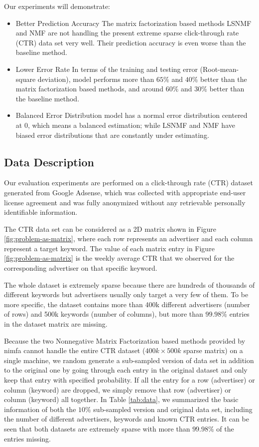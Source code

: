 Our experiments will demonstrate:
\begin{itemize} \itemsep -2pt
\item {Better Prediction Accuracy} The matrix factorization based methods LSNMF and NMF are not
  handling the present extreme sparse click-through rate (CTR) data set very well. Their
  prediction accuracy is even worse than the baseline method.
\item {Lower Error Rate} In terms of the training and testing error (Root-mean-square
  deviation), {\sppan} model performs more than $65\%$ and $40\%$ better
  than the matrix factorization based methods, and around $60\%$ and
  $30\%$ better than the baseline method.
\item {Balanced Error Distribution} {\sppan} model has a normal error distribution centered at 0,
  which means a balanced estimation; while LSNMF and NMF have biased
  error distributions that are constantly under estimating.
\end{itemize}

\subsection{Data Description}
\label{sec:data_desc}
Our evaluation experiments are performed on a click-through rate (CTR)
dataset generated from Google Adsense, which was collected with
appropriate end-user license agreement and was fully anonymized
without any retrievable personally identifiable information.

The CTR data set can be considered as a 2D matrix shown in Figure
\ref{fig:problem-as-matrix}, where each row represents an advertiser
and each column represent a target keyword. The value of each matrix
entry in Figure \ref{fig:problem-as-matrix} is the weekly average
CTR that we observed for the corresponding
advertiser on that specific keyword. 

The whole dataset is extremely
sparse because there are hundreds of thousands of different keywords
but advertisers usually only target a very few of them. To be more
specific, the dataset contains more than 400k different advertisers
(number of rows) and 500k keywords (number of columns), but more than
$99.98\%$ entries in the dataset matrix are missing.

Because the two Nonnegative Matrix Factorization based methods
provided by nimfa cannot handle the entire CTR dataset ($400k \times
500k$ sparse matrix) on a single machine, we random generate a
sub-sampled version of data set in addition to the original one by going through each entry in the
original dataset and only keep that entry with specified
probability. If all the entry for a row (advertiser) or column
(keyword) are dropped, we simply remove that row (advertiser) or
column (keyword) all together. In Table \ref{tab:data}, we summarized
the basic information of both the $10\%$ sub-sampled version and
original data set, including the number of different advertisers,
keywords and known CTR entries. It can be seen that both datasets are
extremely sparse with more than $99.98\%$ of the entries missing.


